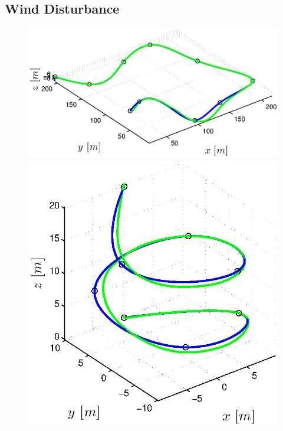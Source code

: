 \subsection{Wind Disturbance}
\label{sub:results_wind_disturbance}

\begin{figure}[h]
  \begin{minipage}[t]{0.32\textwidth}
    \includegraphics[width = \textwidth]{trackings/figure_3D_road_SplineDegree3_trajectoryFollowing_Disturbance_1}
  \end{minipage}
  \hfill
  \begin{minipage}[t]{0.32\textwidth}
    \includegraphics[width = \textwidth]{trackings/figure_3D_helix_SplineDegree3_trajectoryFollowing_Disturbance_1}

\end{minipage}
\end{figure}
